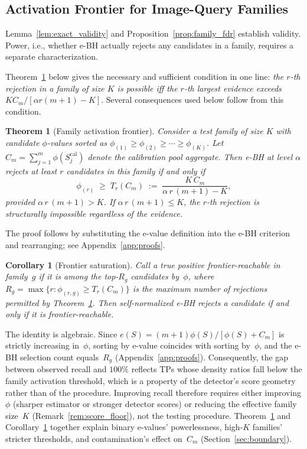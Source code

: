 \documentclass{article}
\newtheorem{theorem}{Theorem}
\newtheorem{corollary}{Corollary}
\theoremstyle{remark}
\newcommand{\1}{\mathbf{1}}
\begin{document}
\subsection{Activation Frontier for Image-Query Families}

Lemma~\ref{lem:exact_validity} and Proposition~\ref{prop:family_fdr}
establish validity. Power, i.e., whether e-BH actually rejects any
candidates in a family, requires a separate characterization.

Theorem~\ref{thm:activation_frontier} below gives the necessary and
sufficient condition in one line: \emph{the $r$-th rejection in a family of size $K$
is possible iff the $r$-th largest evidence exceeds
$K C_m / [\alpha r(m{+}1){-}K]$}. Several consequences used below
follow from this condition.

\begin{theorem}[Family activation frontier]
\label{thm:activation_frontier}
Consider a test family of size $K$ with candidate $\phi$-values sorted as
$\phi_{(1)} \ge \phi_{(2)} \ge \cdots \ge \phi_{(K)}$.
Let $C_m = \sum_{j=1}^m \phi(S_j^{\mathrm{cal}})$ denote the calibration
pool aggregate. Then e-BH at level $\alpha$ rejects at least $r$ candidates
in this family if and only if
\begin{equation}
\phi_{(r)} \;\ge\; T_r(C_m)
\;:=\; \frac{K \, C_m}{\alpha\, r\, (m+1) - K},
\label{eq:activation_threshold}
\end{equation}
provided $\alpha\, r\, (m+1) > K$. If $\alpha\, r\, (m+1) \le K$, the
$r$-th rejection is structurally impossible regardless of the evidence.
\end{theorem}

The proof follows by substituting the e-value definition into the e-BH
criterion and rearranging; see Appendix~\ref{app:proofs}.

\begin{corollary}[Frontier saturation]
\label{cor:recall_ceiling}
Call a true positive \emph{frontier-reachable} in family~$g$ if it is
among the top-$R_g$ candidates by~$\phi$, where
$R_g=\max\{r:\phi_{(r,g)}\ge T_r(C_m)\}$ is the maximum number of
rejections permitted by Theorem~\ref{thm:activation_frontier}. Then
self-normalized e-BH rejects a candidate if and only if it is
frontier-reachable.
\end{corollary}

The identity is algebraic. Since
$e(S)=(m\!+\!1)\phi(S)/[\phi(S)+C_m]$ is strictly increasing
in~$\phi$, sorting by e-value coincides with sorting by~$\phi$, and
the e-BH selection count equals~$R_g$
(Appendix~\ref{app:proofs}). Consequently, the gap between observed
recall and $100\%$ reflects TPs whose density ratios fall below the
family activation threshold, which is a property of the detector's
score geometry rather than of the procedure. Improving recall therefore requires either improving $\phi$
(sharper estimator or stronger detector scores) or reducing the
effective family size~$K$ (Remark~\ref{rem:score_floor}), not the
testing procedure.
Theorem~\ref{thm:activation_frontier} and
Corollary~\ref{cor:recall_ceiling} together explain binary
e-values' powerlessness, high-$K$ families' stricter thresholds, and
contamination's effect on~$C_m$
(Section~\ref{sec:boundary}).
\end{document}
